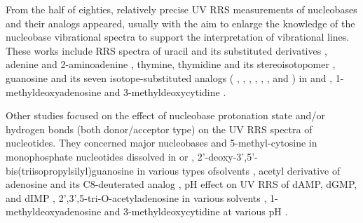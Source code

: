 From the half of eighties, relatively precise UV RRS measurements of
nucleobases and their analogs appeared, usually with the aim to enlarge the
knowledge of the nucleobase vibrational spectra to support the interpretation
of vibrational lines.
These works include RRS spectra of uracil and its  substituted
derivatives
\parencite{Ghomi1986},
adenine and 2-aminoadenine
\parencite{Dhaouadi1994},
thymine, thymidine and its stereoisotopomer
\parencite{Tsuboi1997},
guanosine and its seven isotope-substituted analogs
(%
	,
	,
	,
	,
	,
	,
	and %
)
in  and 
\parencite{%
	Toyama1999,%
	Toyama2002%
},
1-methyldeoxyadenosine and 3-methyldeoxycytidine
\parencite{Jayanth2011}.

Other studies focused on the effect of nucleobase protonation state and/or
hydrogen bonds (both donor/acceptor type) on the UV RRS spectra of nucleotides.
They concerned major nucleobases and 5-methyl-cytosine in monophosphate
nucleotides dissolved in  or 
\parencite{Gfrorer1991},
2'-deoxy-3',5'-bis(triisopropylsilyl)\allowbreak{}guanosine
in various types ofsolvents
\parencite{Toyama1996},
acetyl derivative of adenosine and its C8-deuterated analog
\parencite{Fujimoto1998},
pH effect on UV RRS of dAMP, dGMP, and dIMP
\parencite{Sokolov2000},
2',3',5-tri-O-acetyladenosine in various solvents
\parencite{Toyama2005a},
1-methyldeoxyadenosine and 3-methyldeoxycytidine at various pH
\parencite{Jayanth2011}.

